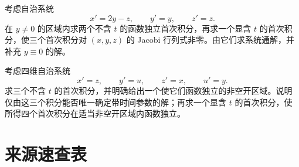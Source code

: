 \noindent\begin{minipage}{\linewidth}
考虑自治系统
\[x'=2y-z,\qquad y'=y,\qquad z'=z.\]
在 $y\ne0$ 的区域内求两个不含 $t$ 的函数独立首次积分，再求一个显含 $t$ 的首次积分，使三个首次积分对 $(x,y,z)$ 的 Jacobi 行列式非零。由它们求系统通解，并补充 $y\equiv0$ 的解。
\end{minipage}\par\vspace{5pt}
\noindent\begin{minipage}{\linewidth}
考虑四维自治系统
\[x'=z,\qquad y'=u,\qquad z'=x,\qquad u'=y.\]
求三个不含 $t$ 的首次积分，并明确给出一个使它们函数独立的非空开区域。说明仅由这三个积分能否唯一确定带时间参数的解；再求一个显含 $t$ 的首次积分，使所得四个首次积分在适当非空开区域内函数独立。
\end{minipage}\par\vspace{5pt}
\newpage\section*{来源速查表}
